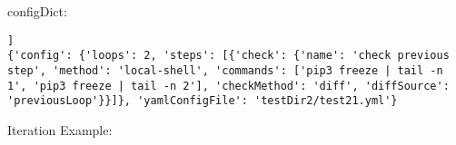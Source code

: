 \documentclass[10pt,a4paper]{article}
\begin{document}
configDict:

\begin{lstlisting}[]]
{'config': {'loops': 2, 'steps': [{'check': {'name': 'check previous step', 'method': 'local-shell', 'commands': ['pip3 freeze | tail -n 1', 'pip3 freeze | tail -n 2'], 'checkMethod': 'diff', 'diffSource': 'previousLoop'}}]}, 'yamlConfigFile': 'testDir2/test21.yml'}
\end{lstlisting}



Iteration Example:

         
\end{document}
